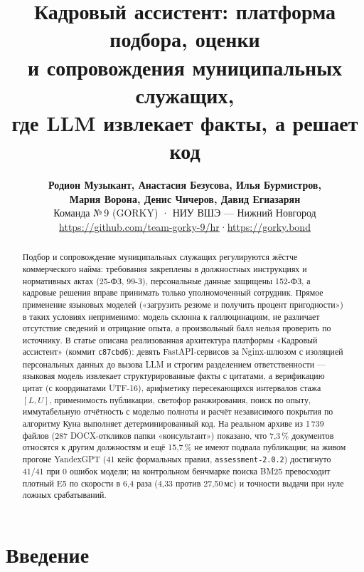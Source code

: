 \documentclass[10pt,a4paper,twocolumn]{article}
\title{\bfseries Кадровый ассистент: платформа подбора, оценки\\
  и сопровождения муниципальных служащих,\\
  где LLM извлекает факты, а решает код}
\author{%
  \textbf{Родион Музыкант, Анастасия Безусова, Илья Бурмистров,}\\
  \textbf{Мария Ворона, Денис Чичеров, Давид Егиазарян}\\[2pt]
  Команда №\,9 (GORKY) · НИУ ВШЭ — Нижний Новгород\\[2pt]
  \small\url{https://github.com/team-gorky-9/hr}\quad·\quad\url{https://gorky.bond}}
\date{}
\newcommand{\code}[1]{\texttt{#1}}
\begin{document}
\maketitle

\begin{abstract}
Подбор и сопровождение муниципальных служащих регулируются жёстче коммерческого найма:
требования закреплены в должностных инструкциях и нормативных актах (25-ФЗ, 99-З), персональные
данные защищены 152-ФЗ, а кадровые решения вправе принимать только уполномоченный сотрудник.
Прямое применение языковых моделей («загрузить резюме и получить процент пригодности») в таких
условиях неприменимо: модель склонна к галлюцинациям, не различает отсутствие сведений и
отрицание опыта, а произвольный балл нельзя проверить по источнику. В статье описана
реализованная архитектура платформы «Кадровый ассистент» (коммит \code{c87cbd6}): девять
FastAPI-сервисов за Nginx-шлюзом с изоляцией персональных данных до вызова LLM и строгим
разделением ответственности — языковая модель извлекает структурированные факты с цитатами, а
верификацию цитат (с координатами UTF-16), арифметику пересекающихся интервалов стажа $[L, U]$,
применимость публикации, светофор ранжирования, поиск по опыту, иммутабельную отчётность с
моделью полноты и расчёт независимого покрытия по алгоритму Куна выполняет детерминированный код.
На реальном архиве из 1\,739 файлов (287 DOCX-откликов папки «консультант») показано, что 7,3\,\%
документов относятся к другим должностям и ещё 15,7\,\% не имеют подвала публикации; на живом
прогоне YandexGPT (41 кейс формальных правил, \code{assessment-2.0.2}) достигнуто 41/41 при 0
ошибок модели; на контрольном бенчмарке поиска BM25 превосходит плотный E5 по скорости в 6,4 раза
(4,33 против 27,50\,мс) и точности выдачи при нуле ложных срабатываний.
\end{abstract}

\section{Введение}
\end{document}
